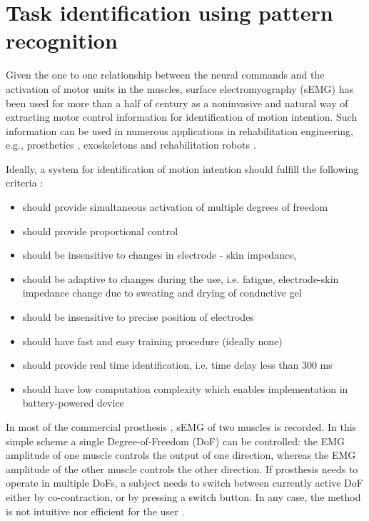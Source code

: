 \section{Task identification using pattern recognition}

Given the one to one relationship between the neural commands and the activation of motor units in the muscles, surface electromyography (sEMG) has been used for more than a half of century as a noninvasive and natural way of extracting motor control information for identification of motion intention. Such information can be used in numerous applications in rehabilitation engineering, e.g., prosthetics \citep{Li2010, Young2013, Stango2015}, exoskeletons \citep{VacaBenitez2013} and rehabilitation robots \citep{Dipietro2005, Marchal-Crespo2009, Cesqui2013}.

Ideally, a system for identification of motion intention should fulfill the following criteria \citep{Farina2014}:
\begin{itemize}
\item should provide simultaneous activation of multiple degrees of freedom
\item should provide proportional control
\item should be insensitive to changes in electrode - skin impedance,
\item should be adaptive to changes during the use, i.e. fatigue, electrode-skin impedance change due to sweating and drying of conductive gel
\item should be insensitive to precise position of electrodes
\item should have fast and easy training procedure (ideally none)
\item should provide real time identification, i.e. time delay less than 300 ms \citep{Oskoei2007}
\item should have low computation complexity which enables implementation in battery-powered device
\end{itemize}

In most of the commercial prosthesis \citep{Parker1986}, sEMG of two muscles is recorded. In this simple scheme a single Degree-of-Freedom (DoF) can be controlled: the EMG amplitude of one muscle controls the output of one direction, whereas the EMG amplitude of the other muscle controls the other direction. If prosthesis needs to operate in multiple DoFs, a subject needs to switch between currently active DoF either by co-contraction, or by pressing a switch button. In any case, the method is not intuitive nor efficient for the user \citep{Farina2014}.

